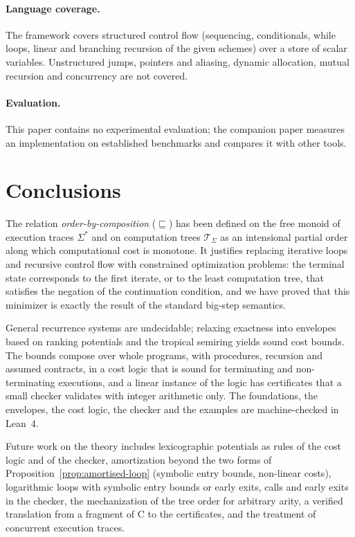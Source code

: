 \documentclass[oneside,english]{amsart}
\numberwithin{equation}{section}
\numberwithin{figure}{section}
\theoremstyle{plain}
\theoremstyle{definition}
\theoremstyle{plain}
\theoremstyle{remark}
\theoremstyle{plain}
\theoremstyle{definition}
\theoremstyle{plain}
\theoremstyle{remark}
\begin{document}
\paragraph{Language coverage.}
The framework covers structured control flow (sequencing, conditionals, while loops, linear and branching recursion of the given schemes) over a store of scalar variables. Unstructured jumps, pointers and aliasing, dynamic allocation, mutual recursion and concurrency are not covered.

\paragraph{Evaluation.}
This paper contains no experimental evaluation; the companion paper \cite{crosscheckTool} measures an implementation on established benchmarks and compares it with other tools.

\section*{Conclusions}

The relation \textit{order-by-composition} ($\sqsubseteq$) has been defined on the free monoid of execution traces $\Sigma^*$ and on computation trees $\mathcal{T}_\Sigma$ as an intensional partial order along which computational cost is monotone. It justifies replacing iterative loops and recursive control flow with constrained optimization problems: the terminal state corresponds to the first iterate, or to the least computation tree, that satisfies the negation of the continuation condition, and we have proved that this minimizer is exactly the result of the standard big-step semantics.

General recurrence systems are undecidable; relaxing exactness into envelopes based on ranking potentials and the tropical semiring yields sound cost bounds. The bounds compose over whole programs, with procedures, recursion and assumed contracts, in a cost logic that is sound for terminating and non-terminating executions, and a linear instance of the logic has certificates that a small checker validates with integer arithmetic only. The foundations, the envelopes, the cost logic, the checker and the examples are machine-checked in Lean~4.

Future work on the theory includes lexicographic potentials as rules of the cost logic and of the checker, amortization beyond the two forms of Proposition~\ref{prop:amortised-loop} (symbolic entry bounds, non-linear costs), logarithmic loops with symbolic entry bounds or early exits, calls and early exits in the checker, the mechanization of the tree order for arbitrary arity, a verified translation from a fragment of C to the certificates, and the treatment of concurrent execution traces.
\end{document}
